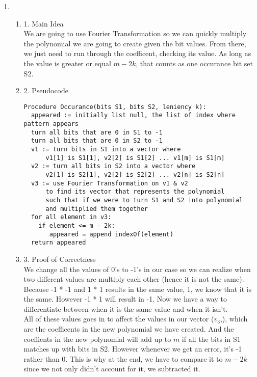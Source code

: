 \documentclass[11pt]{article}
\newenvironment{qparts}{\begin{enumerate}[{(}a{)}]}{\end{enumerate}}
\begin{document}
\begin{qparts}
\begin{qparts}
\item[4.] Running Time Analysis \\
$O(mn)$ because we are literally comparing every single value in S1 (length m), to every single value in S2 (length n). The run time would result in the time it takes for each m to compare to n. And it becomes a multiple of each other, hence our run time is $O(mn)$.
\end{qparts}
\item
\begin{qparts}
\item[1.] Main Idea \\
We are going to use Fourier Transformation so we can quickly multiply the polynomial we are going to create given the bit values. From there, we just need to run through the coefficent, checking its value. As long as the value is greater or equal $m - 2k$, that counts as one occurance bit set S2. 
\item[2.] Pseudocode
\begin{verbatim}
Procedure Occurance(bits S1, bits S2, leniency k):
  appeared := initially list null, the list of index where pattern appears
  turn all bits that are 0 in S1 to -1
  turn all bits that are 0 in S2 to -1
  v1 := turn bits in S1 into a vector where
      v1[1] is S1[1], v2[2] is S1[2] ... v1[m] is S1[m]
  v2 := turn all bits in S2 into a vector where
      v2[1] is S2[1], v2[2] is S2[2] ... v2[n] is S2[n]
  v3 := use Fourier Transformation on v1 & v2 
      to find its vector that represents the polynomial
      such that if we were to turn S1 and S2 into polynomial
      and multiplied them together
  for all element in v3:
    if element <= m - 2k:
       appeared = append indexOf(element)
  return appeared
\end{verbatim}

\item[3.] Proof of Correctness \\
We change all the values of 0's to -1's in our case so we can realize when two different values are multiply each other (hence it is not the same). Because -1 * -1 and 1 * 1 results in the same value, 1, we know that it is the same. However -1 * 1 will result in -1. Now we have a way to differentiate between when it is the same value and when it isn't. \\

All of these values goes in to affect the values in our vector ($v_3$,), which are the coefficents in the new polynomial we have created. And the coeffients in the new polynomial will add up to $m$ if all the bits in S1 matches up with bits in S2. However whenever we get an error, it's -1 rather than 0. This is why at the end, we have to compare it to $m-2k$ since we not only didn't account for it, we subtracted it.


\end{qparts}
\end{qparts}
\end{document}
